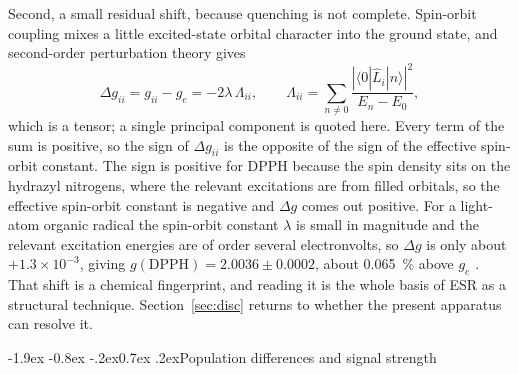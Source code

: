 \documentclass[11pt,a4paper]{article}
\makeatletter
\renewcommand\subsection{\@startsection{subsection}{2}{\z@}%
  {-1.9ex \@plus -0.8ex \@minus -.2ex}{0.7ex \@plus .2ex}{\normalfont\normalsize\bfseries}}
\makeatother
\begin{document}
Second, a small residual shift, because quenching is not complete. Spin-orbit coupling mixes a
little excited-state orbital character into the ground state, and second-order perturbation theory
gives
\begin{equation}
\Delta g_{ii} = g_{ii} - g_e = -2\lambda\,\Lambda_{ii} ,
\qquad
\Lambda_{ii} = \sum_{n \neq 0}
\frac{\left|\langle 0|\hat{L}_i|n\rangle\right|^{2}}{E_n - E_0} ,
\end{equation}
which is a tensor; a single principal component is quoted here. Every term of the sum is
positive, so the sign of $\Delta g_{ii}$ is the opposite of the sign of the effective spin-orbit
constant. The sign is positive for DPPH because the spin density sits on the hydrazyl nitrogens,
where the relevant excitations are from filled orbitals, so the effective spin-orbit constant is
negative and $\Delta g$ comes out positive.
For a light-atom organic radical the spin-orbit constant $\lambda$ is small in magnitude and the
relevant excitation energies are of order several electronvolts, so $\Delta g$ is only about
$+1.3\times10^{-3}$, giving $g(\mathrm{DPPH}) = 2.0036 \pm 0.0002$, about \SI{0.065}{\percent}
above $g_e$ \cite{krzystek}. That shift is a chemical fingerprint, and reading it is the whole
basis of ESR as a structural technique. Section~\ref{sec:disc} returns to whether the present
apparatus can resolve it.

\subsection{Population differences and signal strength}
\end{document}
